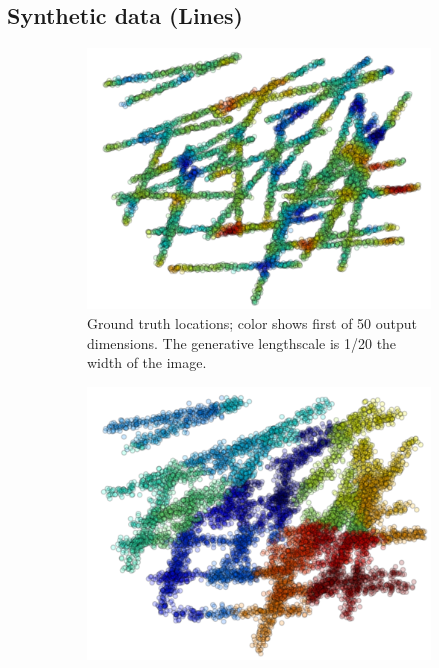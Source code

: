 \documentclass{article}
\begin{document}
\subsection{Synthetic data (Lines)}
\begin{figure}
\centering
\begin{subfigure}[t]{.22\textwidth}
                \includegraphics[width=\textwidth]{lines_truth}
                \caption{ Ground truth locations; color shows first of
                  50 output dimensions. The generative lengthscale is 1/20 the width of the
  image. }
                \label{fig:linestrue}
        \end{subfigure}\hspace{0.5em}
\begin{subfigure}[t]{.22\textwidth}
                \includegraphics[width=\textwidth]{lines_init}

\end{subfigure}
\end{figure}
\end{document}
